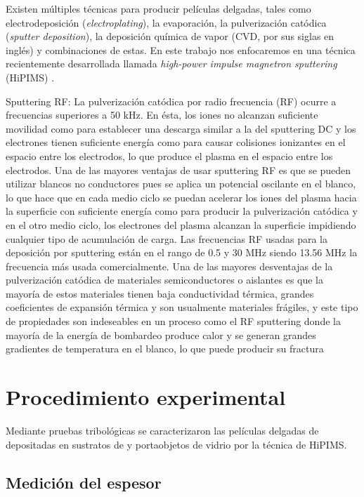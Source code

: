 \documentclass[12pt]{IEEEtran}
\begin{document}
Existen múltiples técnicas para producir películas delgadas, tales como electrodeposición (\emph{electroplating}), la evaporación, la pulverización catódica (\emph{sputter deposition}), la deposición química de vapor  (CVD, por sus siglas en inglés) y combinaciones de estas. En este trabajo nos enfocaremos en una técnica recientemente desarrollada llamada \emph{high-power impulse magnetron sputtering} (HiPIMS) \cite{lundinHiPIMSProcess2010}.

Sputtering RF: La pulverización catódica por radio frecuencia (RF) ocurre a frecuencias superiores a
50 kHz. En ésta, los iones no alcanzan suficiente movilidad como para establecer una descarga similar
a la del sputtering DC y los electrones tienen suficiente energía como para causar colisiones ionizantes
en el espacio entre los electrodos, lo que produce el plasma en el espacio entre los electrodos. Una de
las mayores ventajas de usar sputtering RF es que se pueden utilizar blancos no conductores pues se
aplica un potencial oscilante en el blanco, lo que hace que en cada medio ciclo se puedan acelerar los
iones del plasma hacia la superficie con suficiente energía como para producir la pulverización catódica
y en el otro medio ciclo, los electrones del plasma alcanzan la superficie impidiendo cualquier tipo de
acumulación de carga. Las frecuencias RF usadas para la deposición por sputtering están en el rango de
0.5 y 30 MHz siendo 13.56 MHz la frecuencia más usada comercialmente. Una de las mayores
desventajas de la pulverización catódica de materiales semiconductores o aislantes es que la mayoría
de estos materiales tienen baja conductividad térmica, grandes coeficientes de expansión térmica y son
usualmente materiales frágiles, y este tipo de propiedades son indeseables en un proceso como el RF
sputtering donde la mayoría de la energía de bombardeo produce calor y se generan grandes gradientes
de temperatura en el blanco, lo que puede producir su fractura

\section{Procedimiento experimental}

Mediante pruebas tribológicas se caracterizaron las películas delgadas de  depositadas en sustratos de  y portaobjetos de vidrio por la técnica de HiPIMS.

\subsection{Medición del espesor}
\end{document}

